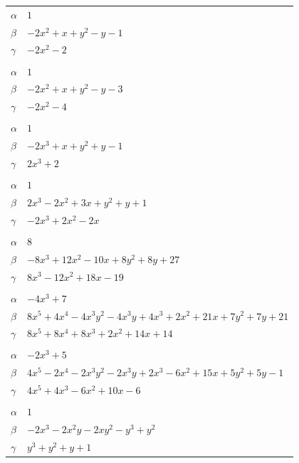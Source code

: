 \documentclass[11pt]{article}
\begin{document}
\begin{longtable}{@{}ll@{}}
$\alpha$ & $1$\\
$\beta$ & $-2x^{2}+x+y^{2}-y-1$\\
$\gamma$ & $-2x^{2}-2$\\
\addlinespace[3pt]
\multicolumn{2}{@{}l}{$\{i,j\}=\{3,20\}$, $k_{ij}=3^{2}$}\\
$\alpha$ & $1$\\
$\beta$ & $-2x^{2}+x+y^{2}-y-3$\\
$\gamma$ & $-2x^{2}-4$\\
\addlinespace[3pt]
\multicolumn{2}{@{}l}{$\{i,j\}=\{4,7\}$, $k_{ij}=3$}\\
$\alpha$ & $1$\\
$\beta$ & $-2x^{3}+x+y^{2}+y-1$\\
$\gamma$ & $2x^{3}+2$\\
\addlinespace[3pt]
\multicolumn{2}{@{}l}{$\{i,j\}=\{4,15\}$, $k_{ij}=3$}\\
$\alpha$ & $1$\\
$\beta$ & $2x^{3}-2x^{2}+3x+y^{2}+y+1$\\
$\gamma$ & $-2x^{3}+2x^{2}-2x$\\
\addlinespace[3pt]
\multicolumn{2}{@{}l}{$\{i,j\}=\{4,16\}$, $k_{ij}=3^{4}$}\\
$\alpha$ & $8$\\
$\beta$ & $-8x^{3}+12x^{2}-10x+8y^{2}+8y+27$\\
$\gamma$ & $8x^{3}-12x^{2}+18x-19$\\
\addlinespace[3pt]
\multicolumn{2}{@{}l}{$\{i,j\}=\{4,25\}$, $k_{ij}=3\cdot 7$}\\
$\alpha$ & $-4x^{3}+7$\\
$\beta$ & $8x^{5}+4x^{4}-4x^{3}y^{2}-4x^{3}y+4x^{3}+2x^{2}+21x+7y^{2}+7y+21$\\
$\gamma$ & $8x^{5}+8x^{4}+8x^{3}+2x^{2}+14x+14$\\
\addlinespace[3pt]
\multicolumn{2}{@{}l}{$\{i,j\}=\{4,27\}$, $k_{ij}=3\cdot 7$}\\
$\alpha$ & $-2x^{3}+5$\\
$\beta$ & $4x^{5}-2x^{4}-2x^{3}y^{2}-2x^{3}y+2x^{3}-6x^{2}+15x+5y^{2}+5y-1$\\
$\gamma$ & $4x^{5}+4x^{3}-6x^{2}+10x-6$\\
\addlinespace[3pt]
\multicolumn{2}{@{}l}{$\{i,j\}=\{5,7\}$, $k_{ij}=3$}\\
$\alpha$ & $1$\\
$\beta$ & $-2x^{3}-2x^{2}y-2xy^{2}-y^{3}+y^{2}$\\
$\gamma$ & $y^{3}+y^{2}+y+1$\\

\end{longtable}
\end{document}
